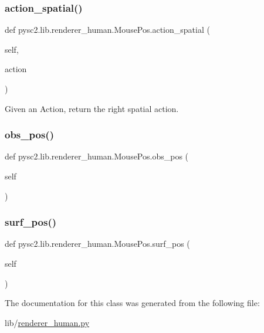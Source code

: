\subsubsection{\texorpdfstring{action\+\_\+spatial()}{action\_spatial()}}
{\footnotesize\ttfamily def pysc2.\+lib.\+renderer\+\_\+human.\+Mouse\+Pos.\+action\+\_\+spatial (\begin{DoxyParamCaption}\item[{}]{self,  }\item[{}]{action }\end{DoxyParamCaption})}

\begin{DoxyVerb}Given an Action, return the right spatial action.\end{DoxyVerb}
 \mbox{\label{classpysc2_1_1lib_1_1renderer__human_1_1_mouse_pos_a3d26543ccef50e87b90428956a43f918}} 
\subsubsection{\texorpdfstring{obs\+\_\+pos()}{obs\_pos()}}
{\footnotesize\ttfamily def pysc2.\+lib.\+renderer\+\_\+human.\+Mouse\+Pos.\+obs\+\_\+pos (\begin{DoxyParamCaption}\item[{}]{self }\end{DoxyParamCaption})}

\mbox{\label{classpysc2_1_1lib_1_1renderer__human_1_1_mouse_pos_a8d72a4fa90ecbca1e8b5e1d033645d6f}} 
\subsubsection{\texorpdfstring{surf\+\_\+pos()}{surf\_pos()}}
{\footnotesize\ttfamily def pysc2.\+lib.\+renderer\+\_\+human.\+Mouse\+Pos.\+surf\+\_\+pos (\begin{DoxyParamCaption}\item[{}]{self }\end{DoxyParamCaption})}



The documentation for this class was generated from the following file\+:\begin{DoxyCompactItemize}
\item 
lib/\mbox{\hyperlink{renderer__human_8py}{renderer\+\_\+human.\+py}}\end{DoxyCompactItemize}

